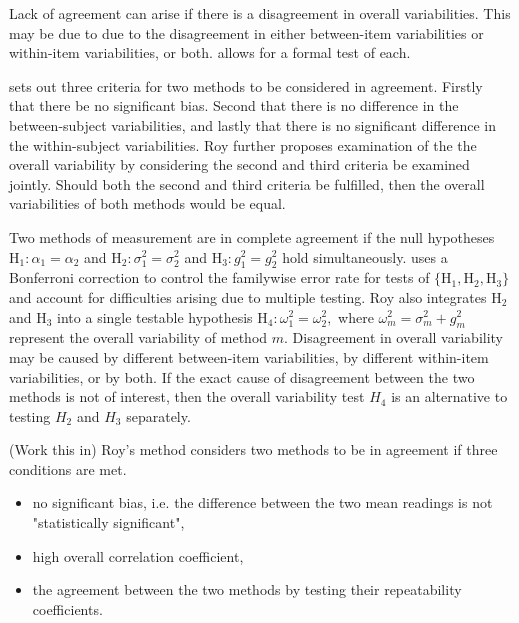 \documentclass[12pt, a4paper]{report}
\theoremstyle{plain}
\theoremstyle{definition}
\theoremstyle{remark}
\begin{document}
	Lack of agreement can arise if there is a disagreement in overall variabilities. This may be due to due to the disagreement in either between-item
	variabilities or within-item variabilities, or both. \citet{ARoy2009} allows for a formal test of each.
	
	\citet{ARoy2009} sets out three criteria for two methods to be considered in agreement. Firstly that there be no significant bias. Second that there is no difference in the between-subject variabilities, and lastly that there is no significant difference in the within-subject variabilities. Roy further proposes examination of the the overall variability by considering the second and third criteria be examined jointly. Should both the second and third criteria be fulfilled, then the overall variabilities of both methods would be equal.
	
		Two methods of measurement are in complete agreement if the null hypotheses $\mathrm{H}_1\colon \alpha_1 = \alpha_2$ and $\mathrm{H}_2\colon \sigma^2_1 = \sigma^2_2 $ and $\mathrm{H}_3\colon g^2_1= g^2_2$ hold simultaneously. \citet{ARoy2009} uses a Bonferroni correction to control the familywise error rate for tests of $\{\mathrm{H}_1, \mathrm{H}_2, \mathrm{H}_3\}$ and account for difficulties arising due to multiple testing. Roy also integrates $\mathrm{H}_2$ and $\mathrm{H}_3$ into a single testable hypothesis $\mathrm{H}_4\colon \omega^2_1=\omega^2_2,$ where $\omega^2_m = \sigma^2_m + g^2_m$ represent the overall variability of method $m.$  Disagreement in overall variability may be caused by different between-item variabilities, by different within-item variabilities, or by both.  If the exact cause of disagreement between the two methods is not of interest, then the overall variability test $H_4$ is an alternative to testing $H_2$ and $H_3$ separately.
		
		(Work this in)	Roy's method considers two methods to be in agreement if three
		conditions are met.
		
		\begin{itemize}
			\item no significant bias, i.e. the difference between the two
			mean readings is not "statistically significant",
			
			\item high overall correlation coefficient,
			
			\item the agreement between the two methods by testing their
			repeatability coefficients.
			
		\end{itemize}
\end{document}
